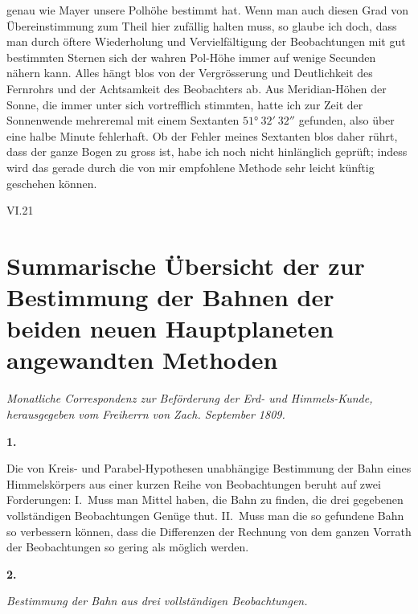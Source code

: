 \documentclass[10pt,a4paper]{article}
\begin{document}
genau wie Mayer unsere Polhöhe bestimmt hat. Wenn man auch diesen Grad von Übereinstimmung zum Theil hier zufällig halten muss, so glaube ich doch, dass man durch öftere Wiederholung und Vervielfältigung der Beobachtungen mit gut bestimmten Sternen sich der wahren Pol-Höhe immer auf wenige Secunden nähern kann. Alles hängt blos von der Vergrösserung und Deutlichkeit des Fernrohrs und der Achtsamkeit des Beobachters ab. Aus Meridian-Höhen der Sonne, die immer unter sich vortrefflich stimmten, hatte ich zur Zeit der Sonnenwende mehreremal mit einem Sextanten $51°\ 32'\ 32''$ gefunden, also über eine halbe Minute fehlerhaft. Ob der Fehler meines Sextanten blos daher rührt, dass der ganze Bogen zu gross ist, habe ich noch nicht hinlänglich geprüft; indess wird das gerade durch die von mir empfohlene Methode sehr leicht künftig geschehen können.

\vspace{1em}
\noindent\textsc{VI.}\hfill 21

\clearpage
\section*{Summarische Übersicht der zur Bestimmung der Bahnen der beiden neuen Hauptplaneten angewandten Methoden}

\begin{center}
\small
\textit{Monatliche Correspondenz zur Beförderung der Erd- und Himmels-Kunde,}\\
\textit{herausgegeben vom Freiherrn von Zach. September 1809.}
\end{center}

\medskip
\noindent
\textbf{1.}

\medskip
\noindent
Die von Kreis- und Parabel-Hypothesen unabhängige Bestimmung der Bahn eines Himmelskörpers aus einer kurzen Reihe von Beobachtungen beruht auf zwei Forderungen: I.~Muss man Mittel haben, die Bahn zu finden, die drei gegebenen vollständigen Beobachtungen Genüge thut. II.~Muss man die so gefundene Bahn so verbessern können, dass die Differenzen der Rechnung von dem ganzen Vorrath der Beobachtungen so gering als möglich werden.

\medskip
\noindent
\textbf{2.}

\medskip
\noindent
\textit{Bestimmung der Bahn aus drei vollständigen Beobachtungen.}
\end{document}

